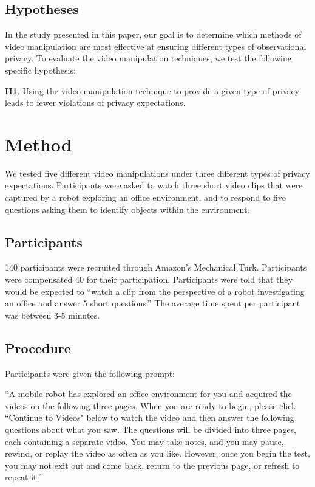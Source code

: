 \documentclass{acm_proc_article-sp}
\begin{document}
\subsection{Hypotheses}
In the study presented in this paper, our goal is to determine which methods of video manipulation are most effective at ensuring different types of observational privacy.  To evaluate the video manipulation techniques, we test the following specific hypothesis:

\textbf{H1}.  Using the video manipulation technique to provide a given type of privacy leads to fewer violations of privacy expectations.

\section{Method}
We tested five different video manipulations under three different types of privacy expectations. Participants were asked to watch three short video clips that were captured by a robot exploring an office environment, and to respond to five questions asking them to identify objects within the environment.  

\subsection{Participants}
140 participants were recruited through Amazon's Mechanical Turk. Participants were compensated 40\textcent  
\: for their participation. Participants were told that they would be expected to ``watch a clip from the perspective of a robot investigating an office and answer 5 short questions.'' The average time spent per participant was between 3-5 minutes.

\subsection{Procedure}
Participants were given the following prompt:

``A mobile robot has explored an office environment for you and acquired the videos on the following three pages. When you are ready to begin, please click ``Continue to Videos" below to watch the video and then answer the following questions about what you saw. The questions will be divided into three pages, each containing a separate video. You may take notes, and you may pause, rewind, or replay the video as often as you like. However, once you begin the test, you may not exit out and come back, return to the previous page, or refresh to repeat it.''
\end{document}
